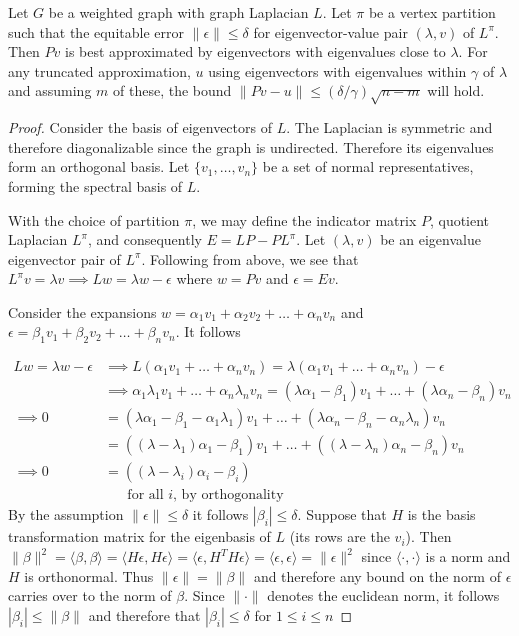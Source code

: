 \documentclass[10pt,a4paper]{amsart}
\begin{document}
\begin{prop}\label{prop:Best_Approx}
    Let $G$ be a weighted graph with graph Laplacian $L$. Let $\pi$ be a vertex partition such that the equitable error $\|\epsilon\| \leq \delta$ for eigenvector-value pair $(\lambda,v)$ of $L^\pi$. Then $Pv$ is best approximated by eigenvectors with eigenvalues close to $\lambda$. For any truncated approximation, $u$ using eigenvectors with eigenvalues within $\gamma$ of $\lambda$ and assuming $m$ of these, the bound $\|Pv-u\| \leq (\delta/\gamma) \sqrt{n-m}$ will hold. 
\end{prop}

\begin{proof}
    Consider the basis of eigenvectors of $L$. The Laplacian is symmetric and therefore diagonalizable since the graph is undirected. Therefore its eigenvalues form an orthogonal basis.  Let $\{v_1,\dotsc,v_n\}$ be a set of normal representatives, forming the spectral basis of $L$.

    With the choice of partition $\pi$, we may define the indicator matrix $P$, quotient Laplacian $L^\pi$, and consequently $E=LP-PL^\pi$. Let $(\lambda,v)$ be an eigenvalue eigenvector pair of $L^\pi$. Following from above, we see that $L^\pi v=\lambda v \implies Lw= \lambda w - \epsilon$ where $w=Pv$ and $\epsilon = Ev$.
    
    Consider the expansions $w=\alpha_1 v_1+\alpha_2 v_2+\dotsc+\alpha_n v_n$ and $\epsilon=\beta_1 v_1+\beta_2 v_2+\dotsc+\beta_n v_n$. It follows
    
    
    \begin{align*}
        Lw=\lambda w -\epsilon &\implies L(\alpha_1 v_1+\dotsc+\alpha_n v_n) = \lambda(\alpha_1 v_1+\dotsc+\alpha_n v_n)- \epsilon\\
        &\implies 
        \alpha_1 \lambda_1 v_1+\dotsc+\alpha_n \lambda_n v_n = (\lambda \alpha_1 - \beta_1 ) v_1+\dotsc+ (\lambda \alpha_n -\beta_n) v_n\\
        \implies 
        0 &= (\lambda \alpha_1 - \beta_1 - \alpha_1\lambda_1 ) v_1+\dotsc+ (\lambda \alpha_n -\beta_n -\alpha_n\lambda_n) v_n\\
        &= ((\lambda-\lambda_1) \alpha_1 - \beta_1) v_1+\dotsc+ ((\lambda-\lambda_n) \alpha_n -\beta_n) v_n\\
        \implies 
        0 &= ((\lambda-\lambda_i)\alpha_i-\beta_i) \\&\hspace{20pt}\text{for all $i$, by orthogonality}
    \end{align*}
    By the assumption $\|\epsilon\|\leq \delta$ it follows $|\beta_i|\leq\delta$. 
    Suppose that $H$ is the basis transformation matrix for the eigenbasis of $L$ (its rows are the $v_i$). Then $\|\beta\|^2=\langle 
    \beta,\beta \rangle=\langle 
    H\epsilon,H \epsilon \rangle=\langle 
    \epsilon,H^TH\epsilon \rangle=\langle 
    \epsilon,\epsilon \rangle=\|\epsilon\|^2$ since $\langle \cdot,\cdot\rangle$ is a norm and $H$ is orthonormal. Thus $\|\epsilon \|=\|\beta\|$ and therefore any bound on the norm of $\epsilon$ carries over to the norm of $\beta$. Since $\|\cdot\|$ denotes the euclidean norm, it follows $|\beta_i|\leq \|\beta\|$ and therefore that $|\beta_i|\leq \delta$ for $1\leq i\leq n$
    

\end{proof}
\end{document}
